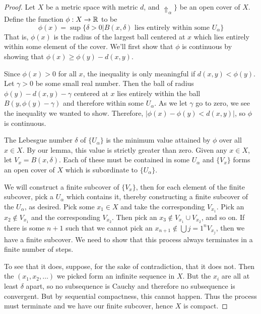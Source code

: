 \begin{proof}
	
Let $X$ be a metric space with metric $d$, and $\Uparrow_\alpha\}$ be an open cover of $X$.  Define the function $\phi:X\rightarrow \mathbb{R}$ to be $$\phi(x) = \sup\{\delta>0 | B(x,\delta) \text{ lies entirely within some } U_\alpha\}$$	
That is, $\phi(x)$ is the radius of the largest ball centered at $x$ which lies entirely within some element of the cover.  We'll first show that $\phi$ is continuous by showing that $\phi(x)\geq \phi(y)-d(x,y)$.

Since $\phi(x)>0$ for all $x$, the inequality is only meaningful if $d(x,y)<\phi(y)$.  Let $\gamma>0$ be some small real number.  Then the ball of radius $\phi(y)-d(x,y)-\gamma$ centered at $x$ lies entirely within the ball $B(y,\phi(y)-\gamma)$ and therefore within some $U_\alpha$.  As we let $\gamma$ go to zero, we see the inequality we wanted to show.  Therefore, $|\phi(x)-\phi(y) < d(x,y)|$, so $\phi$ is continuous.

The Lebesgue number $\delta$ of $\{U_\alpha\}$ is the minimum value attained by $\phi$ over all $x\in X$. By our lemma, this value is strictly greater than zero.  Given any $x\in X$, let $V_x=B(x,\delta)$.  Each of these must be contained in some $U_\alpha$ and $\{V_x\}$ forms an open cover of $X$ which is subordinate to $\{U_\alpha\}$.  


We will construct a finite subcover of $\{V_x\}$, then for each element of the finite subcover, pick a $U_\alpha$ which contains it, thereby constructing a finite subcover of the $U_\alpha$, as desired.  Pick some $x_1\in X$ and take the corresponding $V_{x_1}$.  Pick an $x_2\notin V_{x_1}$ and the corresponding $V_{x_2}$.  Then pick an $x_3\notin V_{x_1}\cup V_{x_2}$, and so on.  If there is some $n+1$ such that we cannot pick an $x_{n+1}\notin \bigcup\limits{j=1}^n V_{x_j}$, then we have a finite subcover.  We need to show that this process always terminates in a finite number of steps.

To see that it does, suppose, for the sake of contradiction, that it does not.  Then the $(x_1,x_2,\dots)$ we picked form an infinite sequence in $X$.  But the $x_i$ are all at least $\delta$ apart, so no subsequence is Cauchy and therefore no subsequence is convergent.  But by sequential compactness, this cannot happen.  Thus the process must terminate and we have our finite subcover, hence $X$ is compact.
	
	
	
\end{proof}


